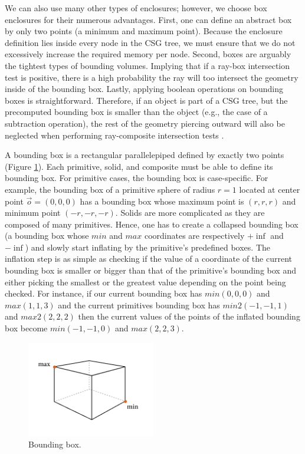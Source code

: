\documentclass[a4paper,11pt,oneside]{article}
\begin{document}
We can also use many other types of enclosures; however, we choose box enclosures for their numerous advantages. First, one can define an abstract box by only two points (a minimum and maximum point). Because the enclosure definition lies inside every node in the CSG tree, we must ensure that we do not excessively increase the required memory per node. Second, boxes are arguably the tightest types of bounding volumes. Implying that if a ray-box intersection test is positive, there is a high probability the ray will too intersect the geometry inside of the bounding box. Lastly, applying boolean operations on bounding boxes is straightforward. Therefore, if an object is part of a CSG tree, but the precomputed bounding box is smaller than the object (e.g., the case of a subtraction operation), the rest of the geometry piercing outward will also be neglected when performing ray-composite intersection tests \cite{ROTH1982109}.

A bounding box is a rectangular parallelepiped defined by exactly two points (Figure \ref{sec4.2:box-points}). Each primitive, solid, and composite must be able to define its bounding box. For primitive cases, the bounding box is case-specific. For example, the bounding box of a primitive sphere of radius $r = 1$ located at center point $\vec{o} = (0, 0, 0)$ has a bounding box whose maximum point is $(r, r, r)$ and minimum point $(-r, -r, -r)$. Solids are more complicated as they are composed of many primitives. Hence, one has to create a collapsed bounding box (a bounding box whose $min$ and $max$ coordinates are respectively $+\inf$ and $-\inf$) and slowly start inflating by the primitive's predefined boxes. The inflation step is as simple as checking if the value of a coordinate of the current bounding box is smaller or bigger than that of the primitive's bounding box and either picking the smallest or the greatest value depending on the point being checked. For instance, if our current bounding box has $min(0, 0, 0)$ and $max(1, 1, 3)$ and the current primitives bounding box has $min2(-1, -1, 1)$ and $max2(2, 2, 2)$ then the current values of the points of the inflated bounding box become $min(-1, -1, 0)$ and $max(2, 2, 3)$.


\begin{figure}[ht]
	\begin{center}
		\includegraphics[width=0.5\textwidth]{section4/4.2/box-enclosure-points.png}
	\end{center}
	\caption{Bounding box.}
	\label{sec4.2:box-points}
\end{figure}
\end{document}
